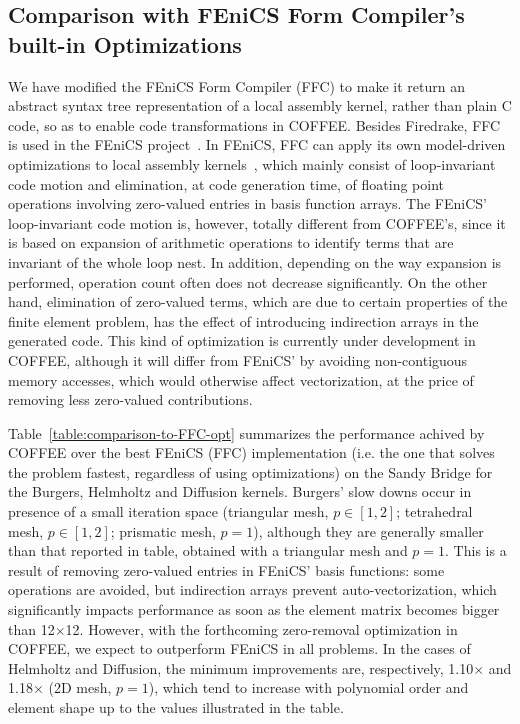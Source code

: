\documentclass[conference]{IEEEtran}
\begin{document}
\subsection{Comparison with FEniCS Form Compiler's built-in Optimizations}
\label{sec:perf-results-fenics}
We have modified the FEniCS Form Compiler (FFC) to make it return an abstract syntax tree representation of a local assembly kernel, rather than plain C code, so as to enable code transformations in COFFEE. Besides Firedrake, FFC is used in the FEniCS project~\cite{Fenics}. In FEniCS, FFC can apply its own model-driven optimizations to local assembly kernels~\cite{quadrature1}, which mainly consist of loop-invariant code motion and elimination, at code generation time, of floating point operations involving zero-valued entries in basis function arrays. The FEniCS' loop-invariant code motion is, however, totally different from COFFEE's, since it is based on expansion of arithmetic operations to identify terms that are invariant of the whole loop nest. In addition, depending on the way expansion is performed, operation count often does not decrease significantly. On the other hand, elimination of zero-valued terms, which are due to certain properties of the finite element problem, has the effect of introducing indirection arrays in the generated code. This kind of optimization is currently under development in COFFEE, although it will differ from FEniCS' by avoiding non-contiguous memory accesses, which would otherwise affect vectorization, at the price of removing less zero-valued contributions.

Table~\ref{table:comparison-to-FFC-opt} summarizes the performance achived by COFFEE over the best FEniCS (FFC) implementation (i.e. the one that solves the problem fastest, regardless of using optimizations) on the Sandy Bridge for the Burgers, Helmholtz and Diffusion kernels. Burgers' slow downs occur in presence of a small iteration space (triangular mesh, $p \in [1, 2]$; tetrahedral mesh, $p \in [1, 2]$; prismatic mesh, $p = 1$), although they are generally smaller than that reported in table, obtained with a triangular mesh and $p = 1$. This is a result of removing zero-valued entries in FEniCS' basis functions: some operations are avoided, but indirection arrays prevent auto-vectorization, which significantly impacts performance as soon as the element matrix becomes bigger than 12$\times$12. However, with the forthcoming zero-removal optimization in COFFEE, we expect to outperform FEniCS in all problems. In the cases of Helmholtz and Diffusion, the minimum improvements are, respectively, 1.10$\times$ and 1.18$\times$ (2D mesh, $p=1$), which tend to increase with polynomial order and element shape up to the values illustrated in the table.
\end{document}
